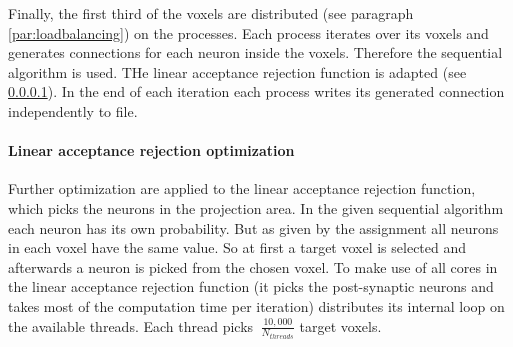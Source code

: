 Finally, the first third of the voxels are distributed (see paragraph \ref{par:loadbalancing}) on the processes.
Each process iterates over its voxels and generates connections for each neuron inside the voxels.
Therefore the sequential algorithm is used. THe linear acceptance rejection function is adapted (see \ref{par:linearacceptancerejection}).
In the end of each iteration each process writes its generated connection independently to file.

\paragraph{Linear acceptance rejection optimization}
\label{par:linearacceptancerejection}
Further optimization are applied to the linear acceptance rejection function,
which picks the neurons in the projection area.
In the given sequential algorithm each neuron has its own probability.
But as given by the assignment all neurons in each voxel have the same value.
So at first a target voxel is selected and afterwards a neuron is picked from the chosen voxel.
To make use of all cores in the linear acceptance rejection function
(it picks the post-synaptic neurons and takes most of the computation time per iteration)
distributes its internal loop on the available threads.
Each thread picks $~ \frac{10,000}{N_{threads}}$ target voxels.


